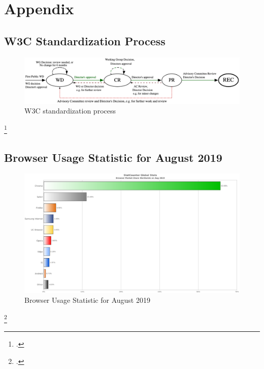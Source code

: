 \appendix

\chapter{Appendix}

\section{W3C Standardization Process}
\label{sec:w3c-process}

\begin{figure}[hbt]
	\centering
	\includegraphics[scale=0.15,angle=90]{pics/svg/w3c_process.eps}
	\caption[W3C standardization process]{W3C standardization process\footnotemark}
	\label{fig:w3c}
\end{figure}
\footcitetext[Source:][Chapter 6.7]{w3c-process}

\newpage

\section{Browser Usage Statistic for August 2019}
\label{sec:stats}

\begin{figure}[hbt]
	\centering
	\includegraphics[scale=0.48,angle=90]{pics/StatCounter-browser-ww-monthly-201908-201908-bar.eps}
	\caption[Browser Usage Statistics for August 2019]{Browser Usage Statistic for August 2019\footnotemark}
	\label{fig:stats}
\end{figure}
\footcitetext[Source][]{statcounter-global}


